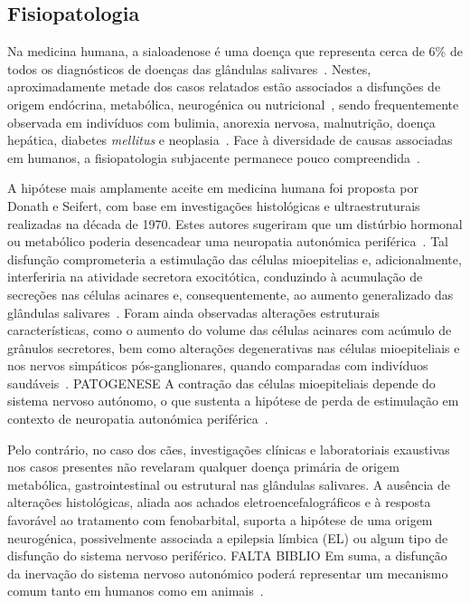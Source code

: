 \subsection{Fisiopatologia}

Na medicina humana, a sialoadenose é uma doença que representa cerca de 6\% de todos os diagnósticos de doenças das glândulas salivares~\cite{boydell_sialadenosis_2000}. Nestes, aproximadamente metade dos casos relatados estão associados a disfunções de origem endócrina, metabólica, neurogénica ou nutricional~\cite{Trinka2023}, sendo frequentemente observada em indivíduos com bulimia, anorexia nervosa, malnutrição, doença hepática, diabetes \textit{mellitus} e neoplasia~\cite{Alcoverro2014}. Face à diversidade de causas associadas em humanos, a fisiopatologia subjacente permanece pouco compreendida~\cite{Ide2011}. 


 A hipótese mais amplamente aceite em medicina humana foi proposta por Donath e Seifert, com base em investigações histológicas e ultraestruturais realizadas na década de 1970. Estes autores sugeriram que um distúrbio hormonal ou metabólico poderia desencadear uma neuropatia autonómica periférica~\cite{Davis2021}. Tal disfunção comprometeria a estimulação das células mioepitelias e, adicionalmente, interferiria na atividade secretora exocitótica, conduzindo à acumulação de secreções nas células acinares e, consequentemente, ao aumento generalizado das glândulas salivares~\cite{Ihrler2010}. Foram ainda observadas alterações estruturais características, como o aumento do volume das células acinares com acúmulo de grânulos secretores, bem como alterações degenerativas nas células mioepiteliais e nos nervos simpáticos pós-ganglionares, quando comparadas com indivíduos saudáveis~\cite{Davis2021}. PATOGENESE A contração das células mioepiteliais depende do sistema nervoso autónomo, o que sustenta a hipótese de perda de estimulação em contexto de neuropatia autonómica periférica~\cite{Ihrler2010}. 


Pelo contrário, no caso dos cães, investigações clínicas e laboratoriais exaustivas nos casos presentes não revelaram qualquer doença primária de origem metabólica, gastrointestinal ou estrutural nas glândulas salivares. A ausência de alterações histológicas, aliada aos achados eletroencefalográficos e à resposta favorável ao tratamento com fenobarbital, suporta a hipótese de uma origem neurogénica, possivelmente associada a epilepsia límbica (EL) ou algum tipo de disfunção do sistema nervoso periférico. FALTA BIBLIO
Em suma, a disfunção da inervação do sistema nervoso autonómico poderá representar um mecanismo comum tanto em humanos como em animais~\cite{Alcoverro2014}. 


